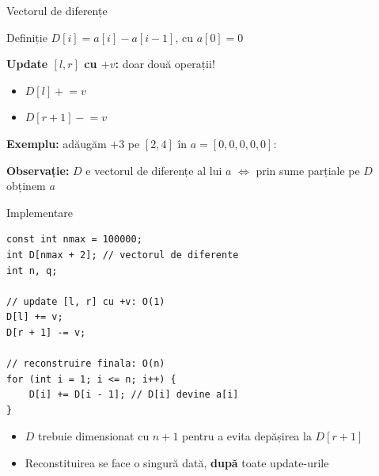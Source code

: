 \documentclass{beamer}
\begin{document}
\begin{frame}{Vectorul de diferențe}
  \begin{block}{Definiție}
    $D[i] = a[i] - a[i-1]$, cu $a[0] = 0$
  \end{block}

  \textbf{Update $[l, r]$ cu $+v$:} doar două operații!
  \begin{itemize}
    \item $D[l] \mathrel{+}= v$
    \item $D[r+1] \mathrel{-}= v$
  \end{itemize}

  \smallskip
  \textbf{Exemplu:} adăugăm $+3$ pe $[2, 4]$ în $a = [0,0,0,0,0]$:

  \begin{center}
  \end{center}

  \textbf{Observație:} $D$ e vectorul de diferențe al lui $a$ $\Longleftrightarrow$ prin sume parțiale pe $D$ obținem $a$
\end{frame}

\begin{frame}[fragile]{Implementare}
  \begin{lstlisting}
const int nmax = 100000;
int D[nmax + 2]; // vectorul de diferente
int n, q;

// update [l, r] cu +v: O(1)
D[l] += v;
D[r + 1] -= v;

// reconstruire finala: O(n)
for (int i = 1; i <= n; i++) {
    D[i] += D[i - 1]; // D[i] devine a[i]
}
  \end{lstlisting}

  \begin{itemize}
    \item $D$ trebuie dimensionat cu $n+1$ pentru a evita depășirea la $D[r+1]$
    \item Reconstituirea se face o singură dată, \textbf{după} toate update-urile
  \end{itemize}
\end{frame}
\end{document}
